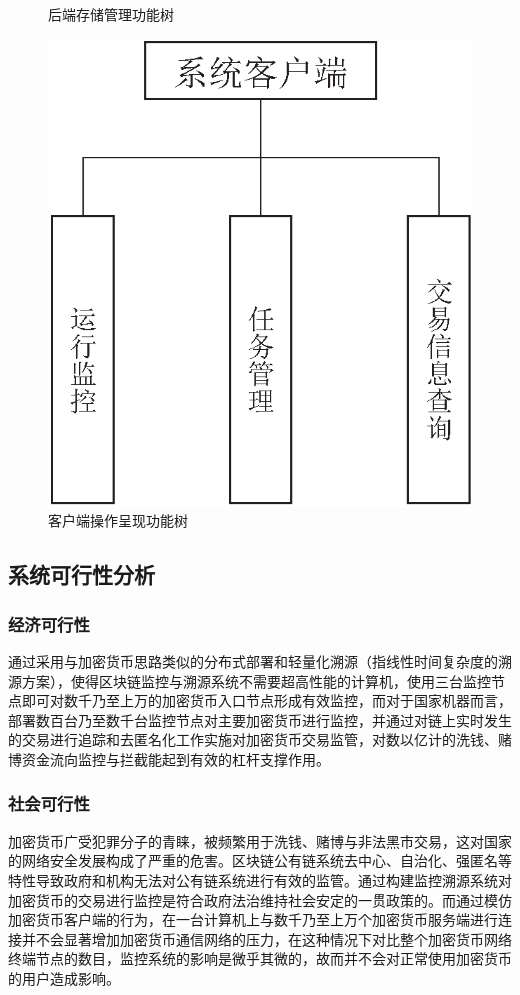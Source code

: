 \documentclass[supercite]{HustGraduPaper}
\theoremstyle{definition}
\begin{document}
{\begin{subfigure}[b]{0.54\textwidth}
    \caption{后端存储管理功能树}
    \label{fig:store}
  \end{subfigure}
  \begin{subfigure}[b]{0.4\textwidth}
    \includegraphics[width=\textwidth]{images/2.1-client.ps}
    \caption{客户端操作呈现功能树}
    \label{fig:client}
  \end{subfigure}
}

\subsection{系统可行性分析}
\subsubsection{经济可行性}
通过采用与加密货币思路类似的分布式部署和轻量化溯源（指线性时间复杂度的溯源方案），使得区块链监控与溯源系统不需要超高性能的计算机，使用三台监控节点即可对数千乃至上万的加密货币入口节点形成有效监控\cite{biryukov2014deanonymisation}，而对于国家机器而言，部署数百台乃至数千台监控节点对主要加密货币进行监控，并通过对链上实时发生的交易进行追踪和去匿名化工作实施对加密货币交易监管，对数以亿计的洗钱、赌博资金流向监控与拦截能起到有效的杠杆支撑作用。
\subsubsection{社会可行性}
加密货币广受犯罪分子的青睐，被频繁用于洗钱、赌博与非法黑市交易，这对国家的网络安全发展构成了严重的危害。区块链公有链系统去中心、自治化、强匿名等特性导致政府和机构无法对公有链系统进行有效的监管。通过构建监控溯源系统对加密货币的交易进行监控是符合政府法治维持社会安定的一贯政策的。而通过模仿加密货币客户端的行为，在一台计算机上与数千乃至上万个加密货币服务端进行连接并不会显著增加加密货币通信网络的压力，在这种情况下对比整个加密货币网络终端节点的数目，监控系统的影响是微乎其微的，故而并不会对正常使用加密货币的用户造成影响。
\end{document}
